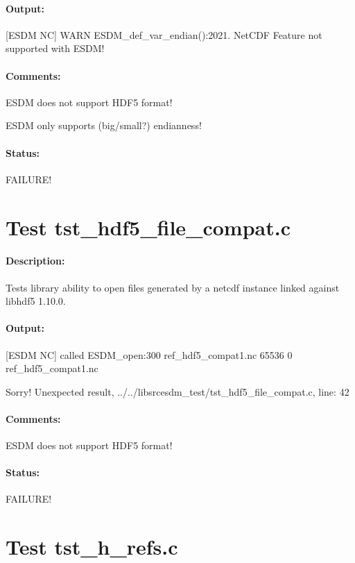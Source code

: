 \paragraph{Output:} [ESDM NC] WARN ESDM\_def\_var\_endian():2021. NetCDF Feature not supported with ESDM!

\paragraph{Comments:} ESDM does not support HDF5 format!

ESDM only supports (big/small?) endianness!

\paragraph{Status:} FAILURE!

\section{Test tst\_hdf5\_file\_compat.c}

\paragraph{Description:} Tests library ability to open files generated by a netcdf instance linked against libhdf5 1.10.0.

\paragraph{Output:} [ESDM NC] called ESDM\_open:300 ref\_hdf5\_compat1.nc 65536 0 ref\_hdf5\_compat1.nc

Sorry! Unexpected result, ../../libsrcesdm\_test/tst\_hdf5\_file\_compat.c, line: 42

\paragraph{Comments:} ESDM does not support HDF5 format!

\paragraph{Status:} FAILURE!

{\color{blue}{Help, Julian!}}

\section{Test tst\_h\_refs.c}

